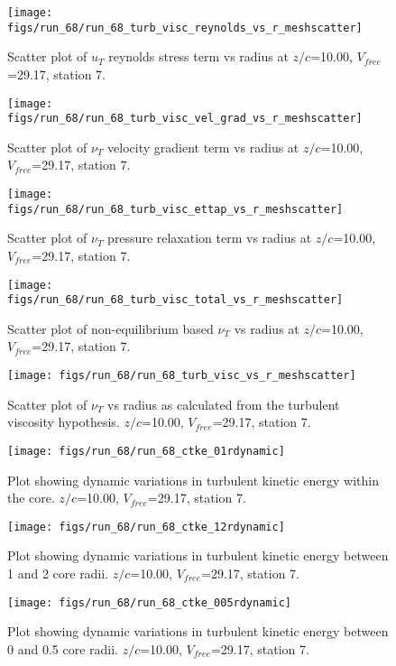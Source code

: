 \begin{figure}[H]
\centering
\texttt{[image: figs/run\_68/run\_68\_turb\_visc\_reynolds\_vs\_r\_meshscatter]}
\caption{Scatter plot of $
u_T$ reynolds stress term vs radius at $z/c$=10.00, $V_{free}$=29.17, station 7.}
\end{figure}


\begin{figure}[H]
\centering
\texttt{[image: figs/run\_68/run\_68\_turb\_visc\_vel\_grad\_vs\_r\_meshscatter]}
\caption{Scatter plot of $\nu_T$ velocity gradient term vs radius at $z/c$=10.00, $V_{free}$=29.17, station 7.}
\end{figure}


\begin{figure}[H]
\centering
\texttt{[image: figs/run\_68/run\_68\_turb\_visc\_ettap\_vs\_r\_meshscatter]}
\caption{Scatter plot of $\nu_T$ pressure relaxation term vs radius at $z/c$=10.00, $V_{free}$=29.17, station 7.}
\end{figure}


\begin{figure}[H]
\centering
\texttt{[image: figs/run\_68/run\_68\_turb\_visc\_total\_vs\_r\_meshscatter]}
\caption{Scatter plot of non-equilibrium based $\nu_T$ vs radius at $z/c$=10.00, $V_{free}$=29.17, station 7.}
\end{figure}


\begin{figure}[H]
\centering
\texttt{[image: figs/run\_68/run\_68\_turb\_visc\_vs\_r\_meshscatter]}
\caption{Scatter plot of $\nu_T$ vs radius as calculated from the turbulent viscosity hypothesis. $z/c$=10.00, $V_{free}$=29.17, station 7.}
\end{figure}


\begin{figure}[H]
\centering
\texttt{[image: figs/run\_68/run\_68\_ctke\_01rdynamic]}
\caption{Plot showing dynamic variations in turbulent kinetic energy within the core. $z/c$=10.00, $V_{free}$=29.17, station 7.}
\end{figure}


\begin{figure}[H]
\centering
\texttt{[image: figs/run\_68/run\_68\_ctke\_12rdynamic]}
\caption{Plot showing dynamic variations in turbulent kinetic energy between 1 and 2 core radii. $z/c$=10.00, $V_{free}$=29.17, station 7.}
\end{figure}


\begin{figure}[H]
\centering
\texttt{[image: figs/run\_68/run\_68\_ctke\_005rdynamic]}
\caption{Plot showing dynamic variations in turbulent kinetic energy between 0 and 0.5 core radii. $z/c$=10.00, $V_{free}$=29.17, station 7.}
\end{figure}


